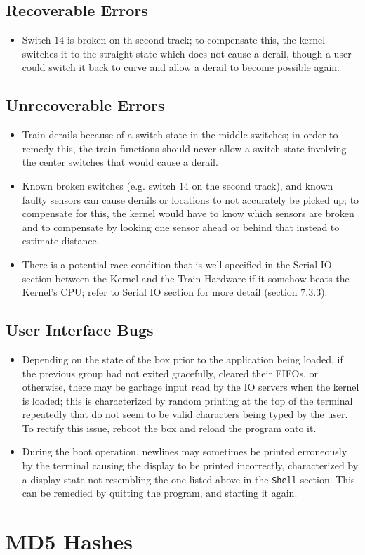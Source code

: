 \documentclass[12pt]{article}
\begin{document}
\subsection{Recoverable Errors}
\begin{itemize}
  \item Switch $14$ is broken on th second track; to compensate this, the kernel switches it to the straight state which does not cause a derail, though a user could switch it back to curve and allow a derail to become possible again.
\end{itemize}
\subsection{Unrecoverable Errors}
\begin{itemize}
  \item Train derails because of a switch state in the middle switches; in order to remedy this, the train functions should never allow a switch state involving the center switches that would cause a derail.
  \item Known broken switches (e.g. switch $14$ on the second track), and known faulty sensors can cause derails or locations to not accurately be picked up; to compensate for this, the kernel would have to know which sensors are broken and to compensate by looking one sensor ahead or behind that instead to estimate distance.
  \item There is a potential race condition that is well specified in the Serial IO section between the Kernel and the Train Hardware if it somehow beats the Kernel's CPU; refer to Serial IO section for more detail (section $7.3.3$).
\end{itemize}
\subsection{User Interface Bugs}
\begin{itemize}
  \item Depending on the state of the box prior to the application being loaded, if the previous group had not exited gracefully, cleared their FIFOs, or otherwise, there may be garbage input read by the IO servers when the kernel is loaded; this is characterized by random printing at the top of the terminal repeatedly that do not seem to be valid characters being typed by the user.  To rectify this issue, reboot the box and reload the program onto it.
  \item During the boot operation, newlines may sometimes be printed erroneously by the terminal causing the display to be printed incorrectly, characterized by a display state not resembling the one listed above in the \texttt{Shell} section.  This can be remedied by quitting the program, and starting it again.
\\[2\baselineskip]
\end{itemize}
\section{MD5 Hashes}

\end{document}
